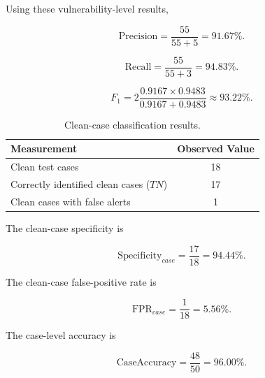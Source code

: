 \documentclass[journal]{IEEEtran}
\begin{document}
Using these vulnerability-level results,

\begin{equation}
\mathrm{Precision}
=
\frac{55}{55+5}
=
91.67\%.
\end{equation}

\begin{equation}
\mathrm{Recall}
=
\frac{55}{55+3}
=
94.83\%.
\end{equation}

\begin{equation}
F_1
=
2
\frac{0.9167\times0.9483}
{0.9167+0.9483}
\approx
93.22\%.
\end{equation}

\begin{table}[!t]
\centering
\caption{Clean-case classification results.}
\label{tab:clean-case-results}
\begin{tabular}{lc}
\toprule
\textbf{Measurement} & \textbf{Observed Value} \\
\midrule
Clean test cases & 18 \\
Correctly identified clean cases ($TN$) & 17 \\
Clean cases with false alerts & 1 \\
\bottomrule
\end{tabular}
\end{table}

The clean-case specificity is

\begin{equation}
\mathrm{Specificity}_{case}
=
\frac{17}{18}
=
94.44\%.
\end{equation}

The clean-case false-positive rate is

\begin{equation}
\mathrm{FPR}_{case}
=
\frac{1}{18}
=
5.56\%.
\end{equation}

The case-level accuracy is

\begin{equation}
\mathrm{CaseAccuracy}
=
\frac{48}{50}
=
96.00\%.
\end{equation}
\end{document}
